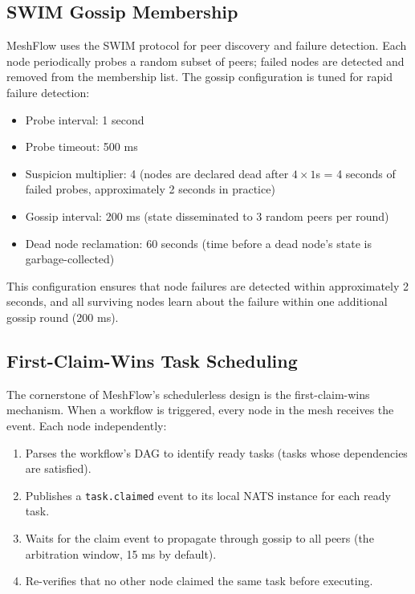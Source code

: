 \documentclass[sigconf]{acmart}
\begin{document}
\subsection{SWIM Gossip Membership}

MeshFlow uses the SWIM protocol for peer discovery and failure detection. Each node periodically probes a random subset of peers; failed nodes are detected and removed from the membership list. The gossip configuration is tuned for rapid failure detection:

\begin{itemize}
\item Probe interval: 1 second
\item Probe timeout: 500 ms
\item Suspicion multiplier: 4 (nodes are declared dead after $4 \times 1$s = 4 seconds of failed probes, approximately 2 seconds in practice)
\item Gossip interval: 200 ms (state disseminated to 3 random peers per round)
\item Dead node reclamation: 60 seconds (time before a dead node's state is garbage-collected)
\end{itemize}

This configuration ensures that node failures are detected within approximately 2 seconds, and all surviving nodes learn about the failure within one additional gossip round (200 ms).

\subsection{First-Claim-Wins Task Scheduling}

The cornerstone of MeshFlow's schedulerless design is the first-claim-wins mechanism. When a workflow is triggered, every node in the mesh receives the event. Each node independently:

\begin{enumerate}
\item Parses the workflow's DAG to identify ready tasks (tasks whose dependencies are satisfied).
\item Publishes a \mbox{\mbox{\texttt{task.claimed}}} event to its local NATS instance for each ready task.
\item Waits for the claim event to propagate through gossip to all peers (the arbitration window, 15 ms by default).
\item Re-verifies that no other node claimed the same task before executing.
\end{enumerate}
\end{document}
